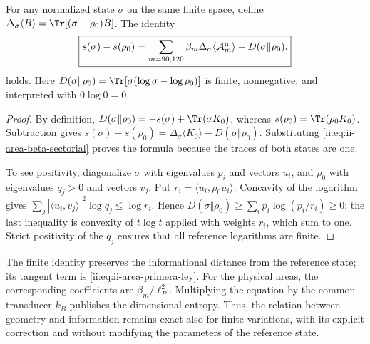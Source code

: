 \begin{theorem}
\label{ii:thm:ii-area-ley-finita}
For any normalized state \(\sigma\) on the same finite space,
define \(\Delta_\sigma\langle B\rangle
=\Tr[(\sigma-\rho_0)B]\). The identity
\begin{equation}
 \boxed{
 s(\sigma)-s(\rho_0)
 =\sum_{m=90,120}\beta_m
      \Delta_\sigma\langle\mathcal A_m^{\rm n}\rangle
   -D(\sigma\Vert\rho_0).}
 \label{ii:eq:ii-area-ley-finita}
\end{equation}
holds.
Here \(D(\sigma\Vert\rho_0)=\Tr[\sigma(\log\sigma-\log\rho_0)]\)
is finite, nonnegative, and interpreted with \(0\log0=0\).
\end{theorem}
\begin{proof}
By definition,
\(D(\sigma\Vert\rho_0)=-s(\sigma)+\Tr(\sigma K_0)\), whereas
\(s(\rho_0)=\Tr(\rho_0K_0)\). Subtraction gives
\(s(\sigma)-s(\rho_0)=\Delta_\sigma\langle K_0\rangle
-D(\sigma\Vert\rho_0)\). Substituting
\eqref{ii:eq:ii-area-beta-sectorial} proves the formula because the
traces of both states are one.

To see positivity, diagonalize \(\sigma\) with eigenvalues
\(p_i\) and vectors \(u_i\), and \(\rho_0\) with eigenvalues
\(q_j>0\) and vectors \(v_j\). Put
\(r_i=\langle u_i,\rho_0u_i\rangle\). Concavity of the logarithm
gives
\(\sum_j|\langle u_i,v_j\rangle|^2\log q_j\le\log r_i\).
Hence
\(D(\sigma\Vert\rho_0)\ge\sum_i p_i\log(p_i/r_i)\ge0\);
the last inequality is convexity of \(t\log t\) applied
with weights \(r_i\), which sum to one. Strict positivity of the
\(q_j\) ensures that all reference logarithms are finite.
\end{proof}

The finite identity preserves the informational distance from the
reference state; its tangent term is
\eqref{ii:eq:ii-area-primera-ley}. For the physical areas, the
corresponding coefficients are \(\beta_m/\ell_P^2\).
Multiplying the equation by the common transducer \(k_B\) publishes
the dimensional entropy. Thus, the relation between geometry and information
remains exact also for finite variations, with its explicit
correction and without modifying the parameters of the reference state.

